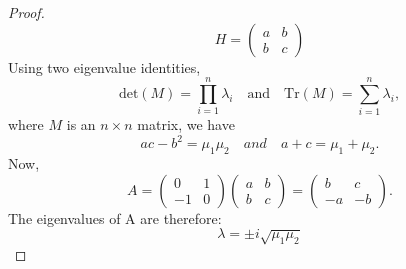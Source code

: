 \begin{proof}
\begin{equation}
H = \begin{pmatrix} a & b \\ b & c \end{pmatrix}
\end{equation}
Using two eigenvalue identities,
\begin{equation}
\text{det}(M) = \prod_{i=1}^n \lambda_i \quad \text{and} \quad \text{Tr}(M) = \sum_{i=1}^n \lambda_i,
\end{equation}
where $M$ is an $n \times n$ matrix, we have
\begin{equation}
ac-b^2 = \mu_1\mu_2 \quad and \quad a+c = \mu_1+\mu_2.
\end{equation}
Now,
\begin{equation}
A = \begin{pmatrix} 0 & 1 \\ -1 & 0 \end{pmatrix} \begin{pmatrix} a & b \\ b & c \end{pmatrix} = \begin{pmatrix} b & c \\ -a & -b \end{pmatrix}.
\end{equation}
The eigenvalues of A are therefore:
\begin{equation}
\lambda = \pm i\sqrt{\mu_1\mu_2}
\end{equation}
\end{proof}

